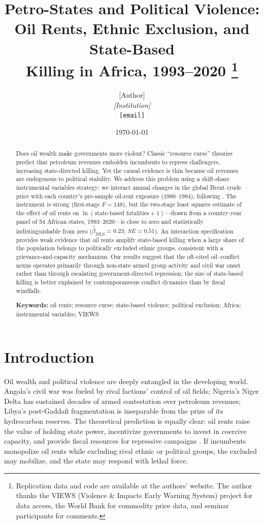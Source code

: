 \documentclass[12pt]{article}
\title{\textbf{Petro-States and Political Violence:\\
       Oil Rents, Ethnic Exclusion, and State-Based\\
       Killing in Africa, 1993--2020}%
       \thanks{Replication data and code are available at the authors' website.
               The author thanks the VIEWS (Violence \& Impacts Early Warning System)
               project for data access, the World Bank for commodity price data,
               and seminar participants for comments.}
}
\author{%
  [Author]\\
  \textit{[Institution]}\\
  \texttt{[email]}%
}
\date{\today}
\begin{document}
\maketitle

\begin{abstract}
\noindent
Does oil wealth make governments more violent?
Classic ``resource curse'' theories predict that petroleum revenues
embolden incumbents to repress challengers, increasing state-directed killing.
Yet the causal evidence is thin because oil revenues are endogenous to
political stability.
We address this problem using a shift-share instrumental variables strategy:
we interact annual changes in the global Brent crude price with each country's
pre-sample oil-rent exposure (1990--1994),
following \citet{bruckner2010international}.
The instrument is strong (first-stage $F = 148$),
but the two-stage least squares estimate of the effect of oil rents on
$\ln(\text{state-based fatalities}+1)$---drawn from a country-year panel of
54 African states, 1993--2020---is close to zero and statistically
indistinguishable from zero ($\hat{\beta}_{2\text{SLS}}=0.23$; $SE=0.51$).
An interaction specification provides weak evidence
that oil rents amplify state-based killing when
a large share of the population belongs to politically excluded ethnic groups,
consistent with a grievance-and-capacity mechanism.
Our results suggest that the oft-cited oil--conflict nexus operates
primarily through non-state armed group activity and civil war onset
rather than through escalating government-directed repression;
the size of state-based killing is better explained
by contemporaneous conflict dynamics than by fiscal windfalls.
\smallskip

\noindent\textbf{Keywords:} oil rents; resource curse; state-based violence;
political exclusion; Africa; instrumental variables; VIEWS
\end{abstract}

\clearpage

\section{Introduction}
\label{sec:intro}

Oil wealth and political violence are deeply entangled in the developing world.
Angola's civil war was fueled by rival factions' control of oil fields;
Nigeria's Niger Delta has sustained decades of armed contestation over
petroleum revenues; Libya's post-Gaddafi fragmentation is inseparable from
the prize of its hydrocarbon reserves.
The theoretical prediction is equally clear: oil rents
raise the value of holding state power, incentivize governments to invest in
coercive capacity, and provide fiscal resources for repressive campaigns
\citep{ross2004natural,fjelde2010mineral,lei2010tigers}.
If incumbents monopolize oil rents while excluding rival ethnic or political
groups, the excluded may mobilize, and the state may respond with lethal force.
\end{document}
